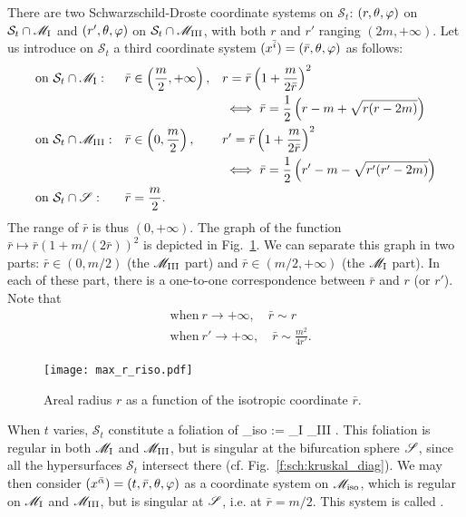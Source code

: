 There are two Schwarzschild-Droste coordinate systems on $\mathcal{S}_t$:
$(r,\theta,\varphi)$ on $\mathcal{S}_t\cap \mathscr{M}_{\rm I}$ and $(r',\theta,\varphi)$ on
$\mathcal{S}_t\cap \mathscr{M}_{\rm III}$, with both $r$ and $r'$ ranging
$(2m,+\infty)$.
Let us introduce on $\mathcal{S}_t$ a third coordinate system $(x^{\bar{i}})=(\bar{r},\theta,\varphi)$
as follows:
\begin{subequations}
\begin{align}
& \mbox{on}\ \mathcal{S}_t\cap \mathscr{M}_{\rm I}:  & & \bar{r} \in \left(\frac{m}{2}, +\infty \right), & &
     r = \bar{r} \left( 1 + \frac{m}{2\bar{r}} \right)^2 \label{e:max:r_riso}\\
& & & & & \iff \bar{r} = \frac{1}{2} \left( r - m + \sqrt{r (r-2m)} \right) \\
&\mbox{on}\ \mathcal{S}_t\cap  \mathscr{M}_{\rm III}:& &
    \bar{r} \in \left(0, \frac{m}{2} \right), & &
    r' = \bar{r} \left( 1 + \frac{m}{2\bar{r}} \right)^2 \label{e:max:rp_riso} \\
& & & & & \iff \bar{r} = \frac{1}{2} \left( r' - m - \sqrt{r' (r'-2m)} \right) \\
&\mbox{on}\ \mathcal{S}_t\cap \mathscr{S} : & & \bar{r} = \frac{m}{2} .& &
\end{align}
\end{subequations}
The range of $\bar{r}$ is thus $(0,+\infty)$.
The graph of the function
$\bar{r} \mapsto \bar{r}(1+m/(2\bar{r}))^2$ is depicted in
Fig.~\ref{f:max:r_riso}. We can separate this graph in two parts:
$\bar{r}\in (0,m/2)$ (the $\mathscr{M}_{\rm III}$ part) and $\bar{r}\in (m/2, +\infty)$
(the $\mathscr{M}_{\rm I}$ part). In each of these part, there is a one-to-one
correspondence between $\bar{r}$ and $r$ (or $r'$). Note that
\begin{subequations}
\begin{align}
    & \mbox{when}\ r\rightarrow +\infty,\quad \bar{r} \sim r \\
    & \mbox{when}\ r'\rightarrow +\infty,\quad \bar{r} \sim \frac{m^2}{4 r'} .
\end{align}
\end{subequations}

\begin{figure}
\centerline{\texttt{[image: max\_r\_riso.pdf]}}
\caption[]{\label{f:max:r_riso} \footnotesize
Areal radius $r$ as a function of the isotropic coordinate $\bar{r}$.}
\end{figure}

When $t$ varies, $\mathcal{S}_t$ constitute a foliation of
\be
    \M_{\rm iso} := \M_{\rm I} \cup \Sp \cup \M_{\rm III} .
\ee
This foliation is regular in both $\mathscr{M}_{\rm I}$ and $\mathscr{M}_{\rm III}$, but is
singular at the bifurcation sphere $\mathscr{S}$, since all
the hypersurfaces $\mathcal{S}_t$ intersect there (cf. Fig.~\ref{f:sch:kruskal_diag}).
We may then consider $(x^{\bar{\alpha}}) = (t,\bar{r},\theta,\varphi)$ as a coordinate system
on $\mathscr{M}_{\rm iso}$, which is regular on $\mathscr{M}_{\rm I}$ and $\mathscr{M}_{\rm III}$,
but is singular at $\mathscr{S}$, i.e. at $\bar{r}=m/2$. This system is called
.

